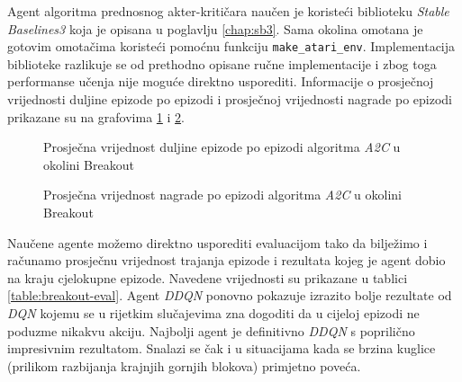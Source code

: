 Agent algoritma prednosnog akter-kritičara naučen je koristeći biblioteku \textit{Stable Baselines3} koja je opisana u poglavlju \ref{chap:sb3}. Sama okolina omotana je gotovim omotačima koristeći pomoćnu funkciju \texttt{make_atari_env}. Implementacija biblioteke razlikuje se od prethodno opisane ručne implementacije i zbog toga performanse učenja nije moguće direktno usporediti. Informacije o prosječnoj vrijednosti duljine epizode po epizodi i prosječnoj vrijednosti nagrade po epizodi prikazane su na grafovima \ref{fig:breakout-a2c-ep-len-mean} i \ref{fig:breakout-a2c-ep-rew-mean}.

\begin{figure}[H]
    \centering
    \caption{Prosječna vrijednost duljine epizode po epizodi algoritma \textit{A2C} u okolini Breakout}
    \label{fig:breakout-a2c-ep-len-mean}
\end{figure}

\begin{figure}[H]
    \centering
    \caption{Prosječna vrijednost nagrade po epizodi algoritma \textit{A2C} u okolini Breakout}
    \label{fig:breakout-a2c-ep-rew-mean}
\end{figure}

Naučene agente možemo direktno usporediti evaluacijom tako da bilježimo i računamo prosječnu vrijednost trajanja epizode i rezultata kojeg je agent dobio na kraju cjelokupne epizode. Navedene vrijednosti su prikazane u tablici \ref{table:breakout-eval}. Agent \textit{DDQN} ponovno pokazuje izrazito bolje rezultate od \textit{DQN} kojemu se u rijetkim slučajevima zna dogoditi da u cijeloj epizodi ne poduzme nikakvu akciju. Najbolji agent je definitivno \textit{DDQN} s poprilično impresivnim rezultatom. Snalazi se čak i u situacijama kada se brzina kuglice (prilikom razbijanja krajnjih gornjih blokova) primjetno poveća.

